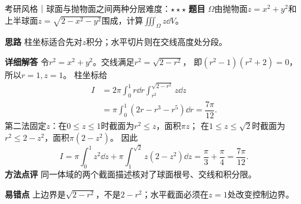 \begin{example}{考研风格｜球面与抛物面之间两种分层}{难度：$\star\star\star$}
\label{cmi:ex:sphereparaboloid}
\textbf{题目} $\Omega$由抛物面$z=x^2+y^2$和上半球面$z=\sqrt{2-x^2-y^2}$围成，计算$\iiint_\Omega z\dd V$。\par
\textbf{思路} 柱坐标适合先对$z$积分；水平切片则在交线高度处分段。\par
\textbf{详细解答} 令$r^2=x^2+y^2$。交线满足$r^2=\sqrt{2-r^2}$，
即$(r^2-1)(r^2+2)=0$，所以$r=1,z=1$。
柱坐标给
\[
\begin{aligned}
I&=2\pi\int_0^1r\dd r\int_{r^2}^{\sqrt{2-r^2}}z\dd z\\
 &=\pi\int_0^1(2r-r^3-r^5)\dd r=\dfrac{7\pi}{12}.
\end{aligned}
\]
第二法固定$z$：在$0\le z\le1$时截面为$r^2\le z$，面积$\pi z$；
在$1\le z\le\sqrt2$时截面为$r^2\le2-z^2$，面积$\pi(2-z^2)$。
因此
\[
I=\pi\int_0^1z^2\dd z+\pi\int_1^{\sqrt2}z(2-z^2)\dd z
=\dfrac{\pi}3+\dfrac{\pi}4=\dfrac{7\pi}{12}.
\]
\textbf{方法点评} 同一体域的两个截面描述核对了球面根号、交线和积分限。\par
\textbf{易错点} 上边界是$\sqrt{2-r^2}$，不是$2-r^2$；水平截面必须在$z=1$处改变控制边界。
\end{example}
